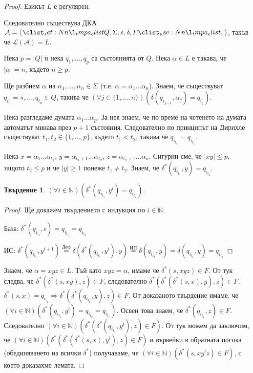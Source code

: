 \documentclass[11pt, a5paper]{report}
\newtheorem{claim}[definition]{Твърдение}
\theoremstyle{remark}
\begin{document}
\begin{proof}
    Езикът $L$ е регулярен.

    Следователно съществува ДКА
    $\mathcal{A} = \opair{Q, \Sigma, s, \delta, F}$,
    такъв че $\mathcal{L}(\mathcal{A}) = L$.

    Нека $p = |Q|$ и нека $q_1, \dots, q_p$ са състоянията от $Q$.
    Нека $\alpha \in L$ е такава, че $|\alpha| = n$, където $n \geq p$.

    Ще разбием $\alpha$ на $\alpha_1, \dots, \alpha_n \in \Sigma$ (т.е. $\alpha = \alpha_1\dots\alpha_n$).
    Знаем, че съществуват $q_{i_0} = s, \dots, q_{i_n} \in Q$, такива че
    $(\forall j \in \{1, \dots, n\}) (\delta(q_{i_{j-1}}, \alpha_j) = q_{i_j})$.

    Нека разгледаме думата $\alpha_1 \dots \alpha_p$.
    За нея знаем, че по време на четенето на думата
    автоматът минава през $p + 1$ състояния.
    Следователно по принципът на Дирихле съществуват
    $t_1, t_2 \in \{1, \dots, p\}$, където $t_1 < t_2$,
    такива че $q_{i_{t_1}} = q_{i_{t_2}}$.

    Нека
    $x = \alpha_1 \dots \alpha_{t_1}$,
    $y = \alpha_{t_1 + 1} \dots \alpha_{t_2}$,
    $z = \alpha_{t_2 + 1} \dots \alpha_n$.
    Сигурни сме, че $|xy| \leq p$, защото $t_2 \leq p$ и че $|y| \geq 1$ понеже $t_1 \neq t_2$.
    Знаем, че $\delta^*(q_{i_{t_1}}, y) = q_{i_{t_2}}$.

    \begin{claim}
        $(\forall i \in \mathbb{N}) (\delta^*(q_{i_{t_1}}, y^i) = q_{i_{t_2}})$.
    \end{claim}

    \begin{proof}
        Ще докажем твърдението с индукция по $i \in \mathbb{N}$.

        База: $\delta^*(q_{i_{t_1}}, \epsilon) = q_{i_{t_1}} = q_{i_{t_2}}$ \checkmark

        ИС: $\delta^*(q_{i_{t_1}}, y^{i+1}) \overset{\text{Деф}}{=} \delta(\delta^*(q_{i_{t_1}}, y^i), y) \overset{\text{ИП}}{=} \delta(q_{i_{t_2}}, y) = \delta(q_{i_{t_1}}, y) = q_{i_{t_2}}$
    \end{proof}

    Знаем, че $\alpha = xyz \in L$.
    Тъй като $xyz = \alpha$, имаме че $\delta^*(s, xyz) \in F$.
    От тук следва, че $\delta^*(\delta^*(s, xy), z) \in F$,
    следователно $\delta^*(\delta^*(\delta^*(s, x), y), z) \in F$.
    $\delta^*(s, x) = q_{i_{t_1}} \Rightarrow \delta^*(\delta^*(q_{i_{t_1}}, y), z) \in F$.
    От доказаното твърдение имаме, че $(\forall i \in \mathbb{N}) (\delta^*(q_{i_{t_1}}, y^i) = q_{i_{t_2}} = q_{i_{t_1}})$.
    Освен това знаем, че $\delta^*(q_{i_{t_2}}, z) \in F$.
    Следователно
    $(\forall i \in \mathbb{N}) (\delta^*(\delta^*(q_{i_{t_1}}, y^i), z) \in F)$.
    От тук можем да заключим, че
    $(\forall i \in \mathbb{N}) (\delta^*(\delta^*(\delta^*(s, x), y^i), z) \in F)$
    и вървейки в обратната посока (обединяването на всички $\delta^*$) получаваме, че
    $(\forall i \in \mathbb{N}) (\delta^*(s, xy^iz) \in F)$,
    с което доказахме лемата.

\end{proof}
\end{document}
